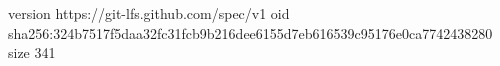 version https://git-lfs.github.com/spec/v1
oid sha256:324b7517f5daa32fc31fcb9b216dee6155d7eb616539c95176e0ca7742438280
size 341
